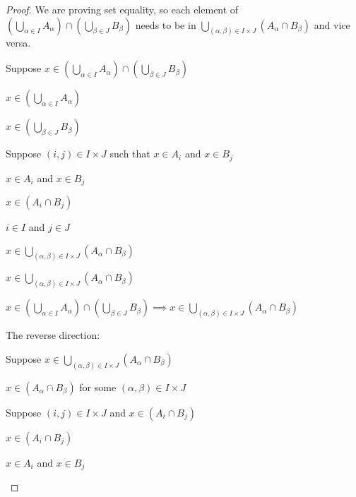 \documentclass[../../main.tex]{subfiles}
\begin{document}
\begin{proof}
    We are proving set equality, so each element of $(\bigcup_{\alpha \in I} A_{\alpha}) \cap (\bigcup_{\beta \in J} B_{\beta})$ needs to be in $\bigcup_{(\alpha, \beta) \in I \times J} (A_{\alpha} \cap B_{\beta})$ and vice versa.
    \begin{lxl}
        \item Suppose $x \in (\bigcup_{\alpha \in I} A_{\alpha}) \cap (\bigcup_{\beta \in J} B_{\beta})$
        \begin{lxl}
            \item $x \in (\bigcup_{\alpha \in I} A_{\alpha})$
            \item $x \in (\bigcup_{\beta \in J} B_{\beta})$
            \item Suppose $(i,j) \in I \times J$ such that $x \in A_i$ and $x \in B_j$
            \begin{lxl}
                \item $x \in A_i$ and $x \in B_j$
                \item $x \in (A_i \cap B_j)$
                \item $i \in I$ and $j \in J$
                \item $x \in \bigcup_{(\alpha, \beta) \in I \times J} (A_{\alpha} \cap B_{\beta})$
            \end{lxl}
            \item $x \in \bigcup_{(\alpha, \beta) \in I \times J} (A_{\alpha} \cap B_{\beta})$ 
        \end{lxl}
        \item $x \in (\bigcup_{\alpha \in I} A_{\alpha}) \cap (\bigcup_{\beta \in J} B_{\beta}) \implies x \in \bigcup_{(\alpha, \beta) \in I \times J} (A_{\alpha} \cap B_{\beta})$
    \end{lxl}
    The reverse direction:
    \begin{lxl}[resume]
        \item Suppose $x \in \bigcup_{(\alpha, \beta) \in I \times J} (A_{\alpha} \cap B_{\beta})$
        \begin{lxl}
            \item $x \in (A_{\alpha} \cap B_{\beta})$ for some $(\alpha, \beta) \in I \times J$ 
            \item Suppose $(i, j) \in I \times J$ and $x \in (A_{i} \cap B_{j})$
            \begin{lxl}
                \item $x \in (A_{i} \cap B_{j})$
                \item $x \in A_{i}$ and $x \in B_{j}$ 

\end{lxl}
\end{lxl}
\end{lxl}
\end{proof}
\end{document}
